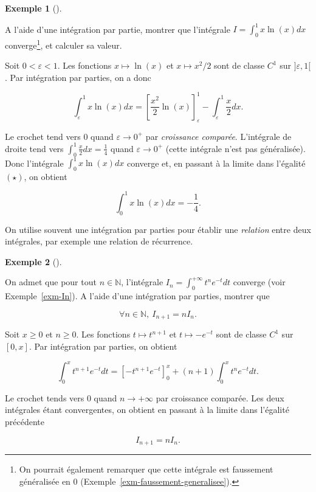 \documentclass[
  french,
  letterpaper,
  DIV=11,
  numbers=noendperiod]{scrreprt}
\theoremstyle{plain}
\theoremstyle{definition}
\theoremstyle{plain}
\theoremstyle{plain}
\theoremstyle{definition}
\theoremstyle{definition}
\newtheorem{example}{Exemple}[chapter]
\theoremstyle{plain}
\theoremstyle{remark}
\begin{document}
\begin{example}[]\protect\hypertarget{exm-xlnx}{}\label{exm-xlnx}

A l'aide d'une intégration par partie, montrer que l'intégrale
\(I=\int_{0}^{1}x\ln(x)dx\) converge\footnote{On pourrait également
  remarquer que cette intégrale est faussement généralisée en \(0\)
  (Exemple~\ref{exm-faussement-generalisee}).}, et calculer sa valeur.

Soit \(0<\varepsilon<1\). Les fonctions \(x \mapsto \ln(x)\) et
\(x \mapsto x^{2}/2\) sont de classe \(C^{1}\) sur \(]\varepsilon,1[\).
Par intégration par parties, on a donc

\begin{equation}\tag{$\star$}
    \int_{\varepsilon}^{1}x \ln(x)dx = \left[\frac{x^{2}}{2}\ln(x)\right]_{\varepsilon}^{1} - \int_{\varepsilon}^{1}\frac{x}{2}dx.
\end{equation}

Le crochet tend vers \(0\) quand \(\varepsilon \to
0^{+}\) par \emph{croissance comparée}. L'intégrale de droite tend vers
\(\int_{0}^{1}\frac{x}{2}dx
= \frac{1}{4}\) quand \(\varepsilon \to 0^+\) (cette intégrale n'est pas
généralisée). Donc l'intégrale \(\int_{0}^{1}x \ln(x)dx\) converge et,
en passant à la limite dans l'égalité \((\star)\), on obtient

\[
    \int_{0}^{1}x \ln(x) dx = -\frac{1}{4}.
\]

\end{example}

On utilise souvent une intégration par parties pour établir une
\emph{relation} entre deux intégrales, par exemple une relation de
récurrence.

\begin{example}[]\protect\hypertarget{exm-recurrence}{}\label{exm-recurrence}

On admet que pour tout \(n \in \mathbb{N}\), l'intégrale
\(I_{n}=\int_{0}^{+\infty}t^{n}e^{-t}dt\) converge (voir
Exemple~\ref{exm-In}). A l'aide d'une intégration par parties, montrer
que

\[
    \forall n \in \mathbb{N},\ I_{n+1}=n I_{n}.
\]

Soit \(x \geqslant 0\) et \(n \geqslant 0\). Les fonctions
\(t \mapsto t^{n+1}\) et \(t \mapsto -e^{-t}\) sont de classe \(C^{1}\)
sur \([0,x]\). Par intégration par parties, on obtient

\[
\int_{0}^{x}t^{n+1}e^{-t}dt = \left[-t^{n+1}e^{-t}\right]_0^{x}
    + (n+1) \int_{0}^{x}t^{n}e^{-t}dt.
\]

Le crochet tends vers \(0\) quand \(n \to +\infty\) par croissance
comparée. Les deux intégrales étant convergentes, on obtient en passant
à la limite dans l'égalité précédente

\[
I_{n+1}= n I_{n}.
\]

\end{example}
\end{document}

